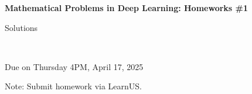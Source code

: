 \documentclass[12pt]{article}
\begin{document}
\begin{center}
{\bf Mathematical Problems in Deep Learning: Homeworks \#1 \begin{solution}Solutions\end{solution}}\\ \medskip
\begin{problem}Due on Thursday 4PM, April 17, 2025 \end{problem}
\end{center}

\begin{problem}
\noindent 
Note: Submit homework via LearnUS.
\end{problem}

\begin{solution}
\end{solution}
\end{document}
